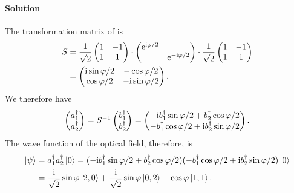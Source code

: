 \documentclass[hyperref, a4paper]{article}
\newcommand*{\ii}{\mathrm{i}}
\newcommand*{\ee}{\mathrm{e}}
\begin{document}
\paragraph{Solution} The transformation matrix of  is 
\begin{equation}
    \begin{aligned}
        S &= \frac{1}{\sqrt{2}} \pmqty{ 1 & -1 \\ 1 & 1 } \cdot \pmqty{\dmat{\ee^{\ii \varphi / 2}, \ee^{- \ii \varphi / 2}}} \cdot \frac{1}{\sqrt{2}} \pmqty{ 1 & -1 \\ 1 & 1 } \\
        &= \pmqty{ \ii \sin \varphi / 2 & - \cos \varphi / 2 \\ \cos \varphi / 2 & - \ii \sin \varphi / 2 }.
    \end{aligned}
\end{equation}
We therefore have 
\begin{equation}
    \pmqty{a_1^\dagger \\ a_2^\dagger} = S^{-1} \pmqty{b_1^\dagger \\ b_2^\dagger} = \pmqty{ - \ii b_1^\dagger \sin \varphi / 2 + b_2^\dagger \cos \varphi / 2 \\ - b_1^\dagger \cos \varphi / 2 + \ii b_2^\dagger \sin \varphi / 2 }.
\end{equation}
The wave function of the optical field, therefore, is 
\begin{equation}
    \begin{aligned}
        \ket{\psi} &= a_1^\dagger a_2^\dagger \ket{0} = (- \ii b_1^\dagger \sin \varphi / 2 + b_2^\dagger \cos \varphi / 2) (- b_1^\dagger \cos \varphi / 2 + \ii b_2^\dagger \sin \varphi / 2) \ket{0} \\
        &= \frac{\ii}{\sqrt{2}} \sin \varphi \ket{2, 0} + \frac{\ii}{\sqrt{2}} \sin \varphi \ket{0, 2} - \cos \varphi \ket{1, 1}.
    \end{aligned}
\end{equation}
\end{document}
